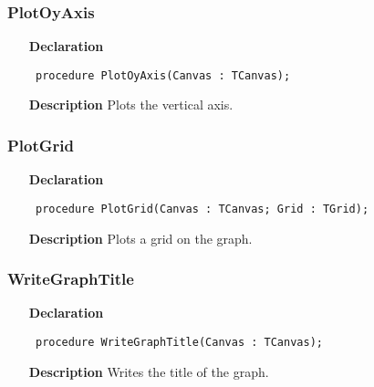 \documentclass[12pt,a4paper,oneside]{report}
\newcommand{\declarationitem}[1]{\textbf{#1}}
\newcommand{\descriptiontitle}[1]{\textbf{#1}}
\newcommand{\code}[1]{\texttt{#1}}
\begin{document}
\subsubsection{PlotOyAxis}
\label{uwinplot-PlotOyAxis}
\begin{itemize}\item[\declarationitem{Declaration}\hfill]
	\begin{flushleft}
		\code{
			procedure PlotOyAxis(Canvas : TCanvas);}
		
	\end{flushleft}
	
	\par
	\item[\descriptiontitle{Description}]
	Plots the vertical axis.
	
\end{itemize}
\subsubsection{PlotGrid}
\label{uwinplot-PlotGrid}
\begin{itemize}\item[\declarationitem{Declaration}\hfill]
	\begin{flushleft}
		\code{
			procedure PlotGrid(Canvas : TCanvas; Grid : TGrid);}
		
	\end{flushleft}
	
	\par
	\item[\descriptiontitle{Description}]
	Plots a grid on the graph.
	
\end{itemize}
\subsubsection{WriteGraphTitle}
\label{uwinplot-WriteGraphTitle}
\begin{itemize}\item[\declarationitem{Declaration}\hfill]
	\begin{flushleft}
		\code{
			procedure WriteGraphTitle(Canvas : TCanvas);}
		
	\end{flushleft}
	
	\par
	\item[\descriptiontitle{Description}]
	Writes the title of the graph.
	
\end{itemize}
\end{document}
